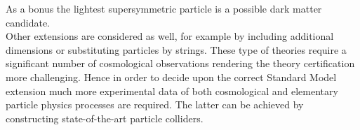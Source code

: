 As a bonus the lightest supersymmetric particle is a possible dark matter candidate.
\\
Other extensions are considered as well, for example by including additional dimensions or substituting particles by strings. These type of theories require a significant number of cosmological observations rendering the theory certification more challenging. %
Hence in order to decide upon the correct Standard Model extension much more experimental data of both cosmological and elementary particle physics processes are required. The latter can be achieved by constructing state-of-the-art particle colliders.

